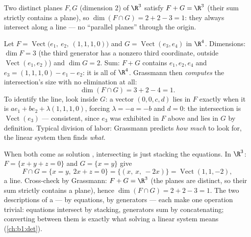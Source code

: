 \begin{example}\label{ex:b1:findim:planes}
Two distinct planes $F, G$ (dimension $2$) of $\R^3$ satisfy $F + G
= \R^3$ (their sum strictly contains a plane), so $\dim(F \cap G) =
2 + 2 - 3 = 1$: they always intersect along a line --- no
``parallel planes'' through the origin.
\end{example}

\begin{example}
\label{ex:b1:findim:grassmannrun}
Let $F = \operatorname{Vect}\bigl(e_1,\ e_2,\ (1,1,1,0)\bigr)$
and $G = \operatorname{Vect}(e_3, e_4)$ in $\R^4$. Dimensions:
$\dim F = 3$ (the third generator has a nonzero third coordinate,
outside $\operatorname{Vect}(e_1, e_2)$) and $\dim G = 2$. Sum:
$F + G$ contains $e_1, e_2, e_4$ and $e_3 = (1,1,1,0) - e_1 -
e_2$: it is all of $\R^4$. Grassmann then \emph{computes} the
intersection's size with no elimination at all:
\[
\dim(F \cap G) = 3 + 2 - 4 = 1 .
\]
To identify the line, look inside $G$: a vector $(0, 0, c, d)$
lies in $F$ exactly when it is $a e_1 + b e_2 + \lambda(1,1,1,0)$,
forcing $\lambda = -a = -b$ and $d = 0$: the intersection is
$\operatorname{Vect}(e_3)$ --- consistent, since $e_3$ was
exhibited in $F$ above and lies in $G$ by definition. Typical
division of labor: Grassmann predicts \emph{how much} to look
for, the linear system then finds \emph{what}.
\end{example}

\begin{example}
\label{ex:b1:findim:intersectequations}
When both  come as solution , intersecting is just
stacking the equations. In $\R^3$: $F = \{x + y + z = 0\}$ and
$G = \{x = y\}$ give
\[
F \cap G = \{x = y,\ 2x + z = 0\}
= \{(x,\ x,\ -2x)\} = \operatorname{Vect}(1, 1, -2),
\]
a line. Cross-check by Grassmann: $F + G = \R^3$ (the planes are
distinct, so their sum strictly contains a plane), hence
$\dim(F\cap G) = 2 + 2 - 3 = 1$. The two descriptions of a
 --- by equations, by generators --- each make one
operation trivial: equations intersect by stacking, generators
sum by concatenating; converting between them is exactly what
solving a linear system means (\cref{ch:b1:det}).
\end{example}

